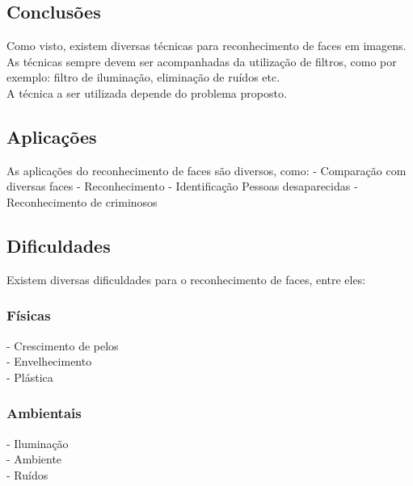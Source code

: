 \documentclass[a4paper,11pt]{article}
\begin{document}
\begin{multicols}{2}
\section{Conclusões}
Como visto, existem diversas técnicas para reconhecimento de faces em imagens. As técnicas sempre devem ser acompanhadas da utilização de filtros, como por exemplo: filtro de iluminação, eliminação de ruídos etc.\\ 
A técnica a ser utilizada depende do problema proposto.

\subsection{Aplicações}
As aplicações do reconhecimento de faces são diversos, como:
- Comparação com diversas faces
- Reconhecimento
- Identificação Pessoas desaparecidas
- Reconhecimento de criminosos

\subsection{Dificuldades}
Existem diversas dificuldades \cite{ref:slide01} para o reconhecimento de faces, entre eles:
\subsubsection{Físicas}
- Crescimento de pelos\\
- Envelhecimento\\
- Plástica\\
\subsubsection{Ambientais}
- Iluminação\\
- Ambiente\\
- Ruídos\\




\end{multicols}
\end{document}
